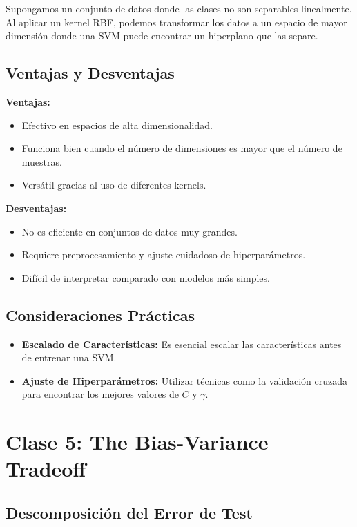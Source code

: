 \documentclass[a4paper, 11pt]{article}
\begin{document}
Supongamos un conjunto de datos donde las clases no son separables linealmente. Al aplicar un kernel RBF, podemos transformar los datos a un espacio de mayor dimensión donde una SVM puede encontrar un hiperplano que las separe.

\subsection{Ventajas y Desventajas}

\textbf{Ventajas:}
\begin{itemize}
    \item Efectivo en espacios de alta dimensionalidad.
    \item Funciona bien cuando el número de dimensiones es mayor que el número de muestras.
    \item Versátil gracias al uso de diferentes kernels.
\end{itemize}

\textbf{Desventajas:}
\begin{itemize}
    \item No es eficiente en conjuntos de datos muy grandes.
    \item Requiere preprocesamiento y ajuste cuidadoso de hiperparámetros.
    \item Difícil de interpretar comparado con modelos más simples.
\end{itemize}

\subsection{Consideraciones Prácticas}

\begin{itemize}
    \item \textbf{Escalado de Características:} Es esencial escalar las características antes de entrenar una SVM.
    \item \textbf{Ajuste de Hiperparámetros:} Utilizar técnicas como la validación cruzada para encontrar los mejores valores de $C$ y $\gamma$.
\end{itemize}


\section{Clase 5: The Bias-Variance Tradeoff}

\subsection{Descomposición del Error de Test}
\end{document}
